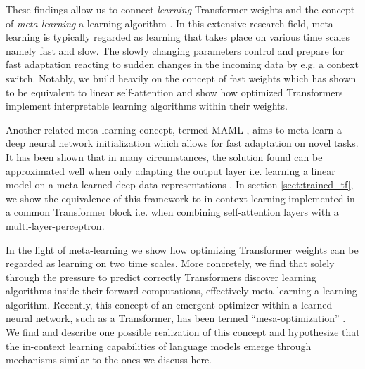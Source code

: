 \documentclass{article}
\theoremstyle{plain}
\theoremstyle{definition}
\theoremstyle{remark}
\begin{document}
These findings allow us to connect \textit{learning} Transformer weights and the concept of \textit{meta-learning} a learning algorithm \citep{schmidhuber_evolutionary_1987,Hinton1987UsingFW,bengio_learning_1990, chalmers_evolution_1991,fast_weights,thrun_learning_1998,meta_hochreiter,andrychowicz_learning_2016, hinton_fast_weights, kirsch2021meta}. In this extensive research field,  meta-learning is typically regarded as learning that takes place on various time scales namely fast and slow. The slowly changing parameters control and prepare for fast adaptation reacting to sudden changes in the incoming data by e.g. a context switch. Notably, we build heavily on the concept of fast weights \cite{fast_weights} which has shown to be equivalent to linear self-attention \cite{linear_transformers_fast_weight} and show how optimized Transformers implement interpretable learning algorithms within their weights.

Another related meta-learning concept, termed MAML \cite{finn_model-agnostic_2017}, aims to meta-learn a deep neural network initialization which allows for fast adaptation on novel tasks. It has been shown that in many circumstances, the solution found can be approximated well when only adapting the output layer i.e. learning a linear model on a meta-learned deep data representations \citep{finn_model-agnostic_2017, finn2018metalearning_universal,DBLP:conf/iclr/GordonBBNT19,meta_opt_net,rusu2019metalearning, raghu_rapid_2020, von_oswald_learning_2021}. 
In section \ref{sect:trained_tf}, we show the equivalence of this framework to in-context learning implemented in a common Transformer block i.e. when combining self-attention layers with a multi-layer-perceptron. 

In the light of meta-learning we show how optimizing Transformer weights can be regarded as learning on two time scales. More concretely, we find that solely through the pressure to predict correctly Transformers discover learning algorithms inside their forward computations, effectively meta-learning a learning algorithm.
Recently, this concept of an emergent optimizer within a learned neural network, such as a Transformer, has been termed ``mesa-optimization'' \citep{mesa}. We find and describe one possible realization of this concept and hypothesize that the in-context learning capabilities of language models emerge through mechanisms similar to the ones we discuss here.
\end{document}
